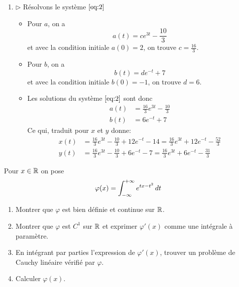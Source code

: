 {\begin{td-sol}[]
\begin{enumerate}
			\item \(\triangleright\) Résolvons le système \(\eqref{eq:2}\)
			\begin{itemize}
				\item Pour \(a\), on a 
				\begin{equation*}
					a(t)=c e^{3t}-\frac{10}3
				\end{equation*}
				et avec la condition initiale \(a(0)=2\), on trouve \(c=\frac{16}3\).

				\item Pour \(b\), on a
				\begin{equation*}
					b(t)=d e^{-t}+7
				\end{equation*}
				et avec la condition initiale \(b(0)=-1\), on trouve \(d=6\).

				\item Les solutions du système \(\eqref{eq:2}\) sont donc
				\begin{equation*}
					\begin{aligned}
						a(t)&=\frac{16}3 e^{3t}-\frac{10}3\\
						b(t)&=6 e^{-t}+7
					\end{aligned}
				\end{equation*}
				Ce qui, traduit pour \(x\) et \(y\) donne:
				\begin{equation*}
					\begin{aligned}
						x(t)&=\frac{16}3 e^{3t}-\frac{10}3+ 12 e^{-t}-14=\frac{16}3 e^{3t}+12 e^{-t}-\frac{52}3\\
						y(t)&=\frac{16}3 e^{3t}-\frac{10}3+ 6 e^{-t}-7=\frac{16}3 e^{3t}+6 e^{-t}-\frac{31}3
					\end{aligned}
				\end{equation*}
			\end{itemize}
		\end{enumerate}
	\end{td-sol}
}{}

\begin{td-exo}[] %
	Pour \(x\in\mathbb{R}\) on pose
	\begin{equation*}
		\varphi(x)=\int_{-\infty}^{+\infty}e^{tx-t^2}\mathop{}\!{d} t
	\end{equation*}

	\begin{enumerate}
		\item Montrer que \(\varphi\) est bien définie et continue sur \(\mathbb{R}\).
		\item Montrer que \(\varphi\) est \(C^1\) sur \(\mathbb{R}\) et exprimer 
		\(\varphi'(x)\) comme une intégrale à paramètre.
		\item En intégrant par parties l'expression de \(\varphi'(x)\), trouver
		un problème de Cauchy linéaire vérifié par \(\varphi\).
		\item Calculer \(\varphi(x)\).
	\end{enumerate}

\end{td-exo}

